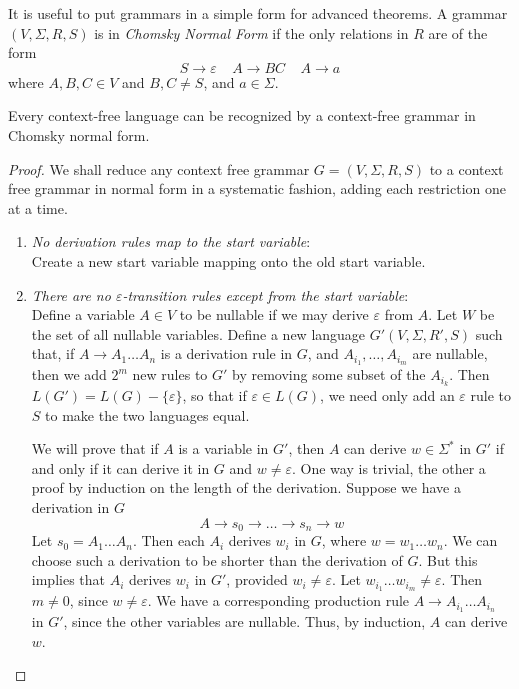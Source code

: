 It is useful to put grammars in a simple form for advanced theorems. A grammar $(V,\Sigma,R,S)$ is in \emph{Chomsky Normal Form} if the only relations in $R$ are of the form
%
\[ S \rightarrow \varepsilon\ \ \ \ \ A \rightarrow BC\ \ \ \ \ A \rightarrow a \]
%
where $A,B,C \in V$ and $B,C \neq S$, and $a \in \Sigma$.

\begin{theorem}
    Every context-free language can be recognized by a context-free grammar in Chomsky normal form.
\end{theorem}
\begin{proof}
    We shall reduce any context free grammar $G = (V,\Sigma,R,S)$ to a context free grammar in normal form in a systematic fashion, adding each restriction one at a time.

    \begin{enumerate}
        \item \emph{No derivation rules map to the start variable}:\\
        Create a new start variable mapping onto the old start variable.

        \item \emph{There are no $\varepsilon$-transition rules except from the start variable}:\\
        Define a variable $A \in V$ to be nullable if we may derive $\varepsilon$ from $A$. Let $W$ be the set of all nullable variables. Define a new language $G'(V,\Sigma,R',S)$ such that, if $A \rightarrow A_1 \dots A_n$ is a derivation rule in $G$, and $A_{i_1}, \dots, A_{i_m}$ are nullable, then we add $2^m$ new rules to $G'$ by removing some subset of the $A_{i_k}$. Then $L(G') = L(G) - \{ \varepsilon \}$, so that if $\varepsilon \in L(G)$, we need only add an $\varepsilon$ rule to $S$ to make the two languages equal.

        We will prove that if $A$ is a variable in $G'$, then $A$ can derive $w \in \Sigma^*$ in $G'$ if and only if it can derive it in $G$ and $w \neq \varepsilon$. One way is trivial, the other a proof by induction on the length of the derivation. Suppose we have a derivation in $G$
        \[ A \rightarrow s_0 \rightarrow \dots \rightarrow s_n \rightarrow w \]
        Let $s_0 = A_1 \dots A_n$. Then each $A_i$ derives $w_i$ in $G$, where $w = w_1 \dots w_n$. We can choose such a derivation to be shorter than the derivation of $G$. But this implies that $A_i$ derives $w_i$ in $G'$, provided $w_i \neq \varepsilon$. Let $w_{i_1} \dots w_{i_m} \neq \varepsilon$. Then $m \neq 0$, since $w \neq \varepsilon$. We have a corresponding production rule $A \rightarrow A_{i_1} \dots A_{i_n}$ in $G'$, since the other variables are nullable. Thus, by induction, $A$ can derive $w$.


\end{enumerate}
\end{proof}
